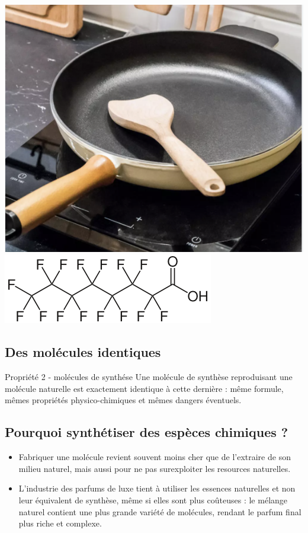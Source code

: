 \documentclass[french, a4paper, 12pt, twocolumn, landscape]{article}
\begin{document}
{\begin{minipage}{.3\linewidth}
	\end{minipage}\hfill
	\begin{minipage}{.3\linewidth}
			\centering

	\includegraphics[width=.6\linewidth]{poel.png}
	\includegraphics[width=.7\linewidth]{Perfluorooctanoic_acid.png}
\end{minipage}
}
\subsection{Des molécules identiques}

\begin{proposition}{Propriété 2 - molécules de synthése}
	Une molécule de synthèse reproduisant une molécule naturelle est exactement identique à cette dernière : même formule, mêmes propriétés physico-chimiques et mêmes dangers éventuels.
\end{proposition}

\subsection{Pourquoi synthétiser des espèces chimiques ? }

\begin{itemize}
	\item Fabriquer une molécule revient souvent moins cher que de l'extraire de son milieu naturel, mais aussi pour ne pas surexploiter les resources naturelles.
	\item L'industrie des parfums de luxe tient à utiliser les essences	naturelles et non leur équivalent de synthèse, même si elles sont plus coûteuses : le mélange naturel contient une plus grande variété de molécules, rendant le parfum final plus riche et complexe. 
\end{itemize}
\end{document}
